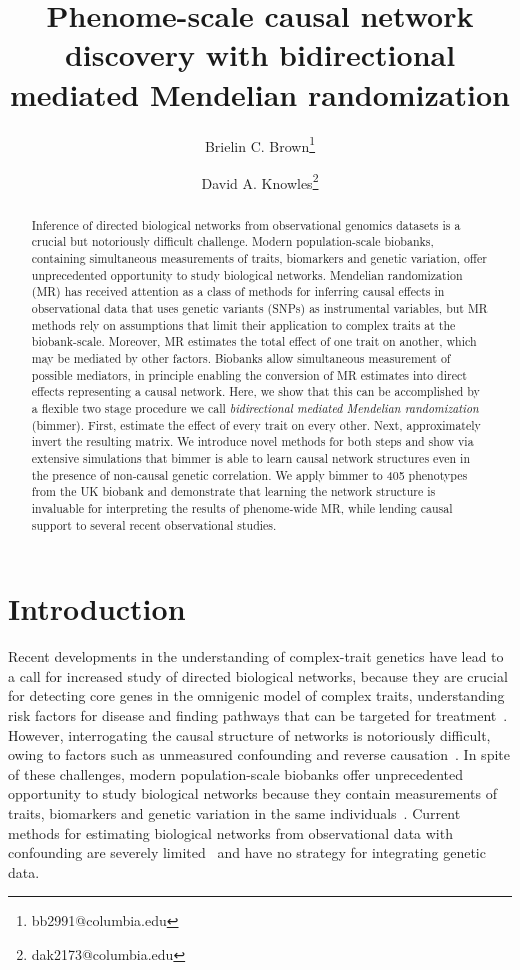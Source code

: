 \documentclass{article}
\title{Phenome-scale causal network discovery with
bidirectional mediated Mendelian randomization}
\author[1, 2]{Brielin C. Brown\thanks{bb2991@columbia.edu}}
\author[2, 3, 4]{David A. Knowles\thanks{dak2173@columbia.edu}}
\affil[1]{Data Science Institute, Columbia University, New York, NY}
\affil[2]{New York Genome Center, New York, NY}
\affil[3]{Department of Computer Science, Columbia University, New York, NY}
\affil[4]{Department of Systems Biology, Columbia University, New York, NY}
\date{}
\begin{document}
\maketitle

\begin{abstract}
Inference of directed biological networks from observational genomics datasets is a crucial
but notoriously difficult challenge. Modern population-scale biobanks, containing simultaneous
measurements of traits, biomarkers and genetic variation, offer unprecedented opportunity
to study biological networks. Mendelian randomization (MR) has received attention as a class
of methods for inferring causal effects in observational data that uses genetic variants (SNPs)
as instrumental variables, but MR methods rely on assumptions that limit their application
to complex traits at the biobank-scale. Moreover, MR estimates the total effect of one trait 
on another, which may be mediated by other factors. Biobanks allow simultaneous measurement 
of possible mediators, in principle enabling the conversion of MR estimates into direct effects 
representing a causal network.
Here, we show that this can be accomplished by a flexible two stage procedure we call
\emph{bidirectional mediated Mendelian randomization} (bimmer). First,
estimate the effect of every trait on every other. Next, approximately invert the resulting matrix.
We introduce novel methods for both steps and show via extensive simulations that bimmer is able
to learn causal network structures even in the presence of non-causal 
genetic correlation. We apply bimmer to 405 
phenotypes from the UK biobank and demonstrate that learning the network structure is invaluable 
for interpreting the results of phenome-wide MR, while lending causal support to several
recent observational studies.
\end{abstract}

\section{Introduction}
Recent developments in the understanding of complex-trait genetics have
lead to a call for increased study of directed biological networks, because they are
crucial for detecting core genes in the omnigenic model of complex traits,
understanding risk factors for disease and finding pathways that can be targeted
for treatment~\cite{Boyle2017,Liu2019,Wray2018}.
However, interrogating the causal structure of networks is notoriously difficult,
owing to factors such as unmeasured confounding and reverse causation~\cite{Parsana2019}.
In spite of these challenges, modern population-scale biobanks 
offer unprecedented opportunity to study biological networks
 because they contain measurements of
traits, biomarkers and genetic variation in the same individuals~\cite{Sudlow2015,Nagai2017}.
Current methods for estimating biological networks from observational data with confounding
are severely limited~\cite{Chandrasekaran2012,Frot2019a,Frot2019b,Stegle2011} and have no strategy
for integrating genetic data.
\end{document}
